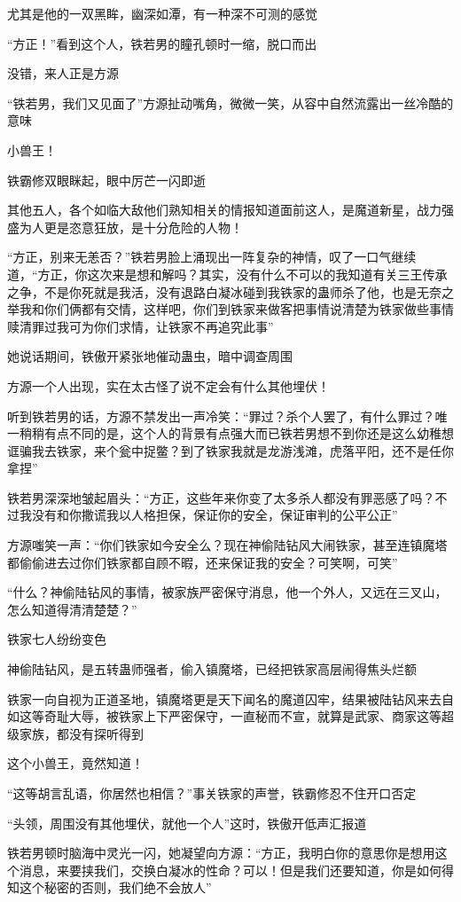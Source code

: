 \begin{this_body}
尤其是他的一双黑眸，幽深如潭，有一种深不可测的感觉

“方正！”看到这个人，铁若男的瞳孔顿时一缩，脱口而出

没错，来人正是方源

“铁若男，我们又见面了”方源扯动嘴角，微微一笑，从容中自然流露出一丝冷酷的意味

小兽王！

铁霸修双眼眯起，眼中厉芒一闪即逝

其他五人，各个如临大敌他们熟知相关的情报知道面前这人，是魔道新星，战力强盛为人更是恣意狂放，是十分危险的人物！

“方正，别来无恙否？”铁若男脸上涌现出一阵复杂的神情，叹了一口气继续道，“方正，你这次来是想和解吗？其实，没有什么不可以的我知道有关三王传承之争，不是你死就是我活，没有退路白凝冰碰到我铁家的蛊师杀了他，也是无奈之举我和你们俩都有交情，这样吧，你们到铁家来做客把事情说清楚为铁家做些事情赎清罪过我可为你们求情，让铁家不再追究此事”

她说话期间，铁傲开紧张地催动蛊虫，暗中调查周围

方源一个人出现，实在太古怪了说不定会有什么其他埋伏！

听到铁若男的话，方源不禁发出一声冷笑：“罪过？杀个人罢了，有什么罪过？唯一稍稍有点不同的是，这个人的背景有点强大而已铁若男想不到你还是这么幼稚想诓骗我去铁家，来个瓮中捉鳖？到了铁家我就是龙游浅滩，虎落平阳，还不是任你拿捏”

铁若男深深地皱起眉头：“方正，这些年来你变了太多杀人都没有罪恶感了吗？不过我没有和你撒谎我以人格担保，保证你的安全，保证审判的公平公正”

方源嗤笑一声：“你们铁家如今安全么？现在神偷陆钻风大闹铁家，甚至连镇魔塔都偷偷进去过你们铁家都自顾不暇，还来保证我的安全？可笑啊，可笑”

“什么？神偷陆钻风的事情，被家族严密保守消息，他一个外人，又远在三叉山，怎么知道得清清楚楚？”

铁家七人纷纷变色

神偷陆钻风，是五转蛊师强者，偷入镇魔塔，已经把铁家高层闹得焦头烂额

铁家一向自视为正道圣地，镇魔塔更是天下闻名的魔道囚牢，结果被陆钻风来去自如这等奇耻大辱，被铁家上下严密保守，一直秘而不宣，就算是武家、商家这等超级家族，都没有探听得到

这个小兽王，竟然知道！

“这等胡言乱语，你居然也相信？”事关铁家的声誉，铁霸修忍不住开口否定

“头领，周围没有其他埋伏，就他一个人”这时，铁傲开低声汇报道

铁若男顿时脑海中灵光一闪，她凝望向方源：“方正，我明白你的意思你是想用这个消息，来要挟我们，交换白凝冰的性命？可以！但是我们还要知道，你是如何得知这个秘密的否则，我们绝不会放人”


\end{this_body}
